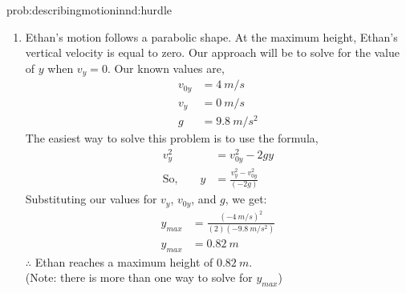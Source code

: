 \begin{solution}{prob:describingmotioninnd:hurdle}
\begin{enumerate}[label=\alph*)]
We are interested in the value of $x$ when the vertical displacement $y$ is equal to the height of the hurdle. So we will find the value of $t$ when $y=\SI{0.5}{m}$ and find the value of $x$ at this time.\\

First, rearrange the equation for $y$ and solve the quadratic:
\begin{align*}
0&=-\frac{1}{2}gt^2+v_{0y}t-y\\
0&=\frac{1}{2}(\SI{-9.8}{m/s^2})t^2+(\SI{4}{m/s})t-\SI{0.5}{m}\\
t&=\SI{0.15}{s},\quad \SI{0.66}{s}
\end{align*}
We want to know when Ethan reaches $\SI{0.5}{m}$ for the first time, so $t=\SI{0.15}{s}$. All that's left is to find the horizontal displacement at this time:
\begin{align*}
x&=v_xt\\
&=(\SI{3}{m/s})(\SI{0.15}{s})\\
&=\SI{0.45}{m}
\end{align*}
$\therefore$ he can get as close as $\SI{0.45}{m}$ from the hurdle before he has to jump, if his initial horizontal velocity is $\SI{3}{m/s}$.
\item Ethan's motion follows a parabolic shape. At the maximum height, Ethan's vertical velocity is equal to zero. Our approach will be to solve for the value of $y$ when $v_y=0$. Our known values are,
\begin{align*}
v_{0y}&=\SI{4}{m/s}\\
v_y&=\SI{0}{m/s}\\
g&=\SI{9.8}{m/s^2}
\end{align*}
The easiest way to solve this problem is to use the formula, 
\begin{align*}
v_y^2&=v_{0y}^2-2gy\\
\textrm{So,}\qquad y&=\frac{v_y^2-v_{0y}^2}{(-2g)}
\end{align*}
Substituting our values for $v_y$, $v_{0y}$, and $g$, we get:
\begin{align*}
y_{max}&=\frac{(\SI{-4}{m/s})^2}{(2)(\SI{-9.8}{m/s^2})}\\
y_{max}&=\SI{0.82}{m}
\end{align*}
$\therefore$ Ethan reaches a maximum height of $\SI{0.82}{m}$. \\

(Note: there is more than one way to solve for $y_{max}$)
\end{enumerate}
\end{solution}


